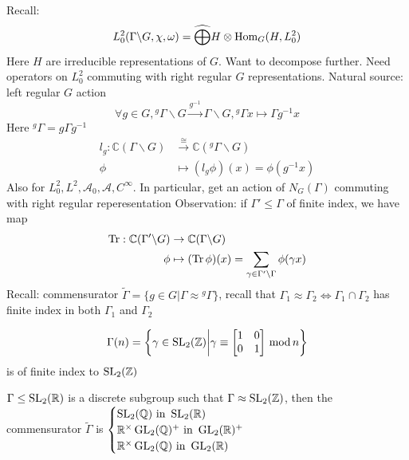 \documentclass[main]{subfiles}
\begin{document}
Recall:
\[L_0^2(\Gamma\backslash G,\chi,\omega)=\widehat{\bigoplus} H\otimes\operatorname{Hom}_G(H,L_0^2)\]
Here $H$ are irreducible representations of $G$.
Want to decompose further. Need operators on $L_0^2$ commuting with right regular $G$ representations. Natural source: left regular $G$ action
\[\forall g\in G,{^g\Gamma}\backslash G\xrightarrow{g^{-1}}\Gamma\backslash G,{^g\Gamma} x\mapsto\Gamma g^{-1}x\]
Here ${^g\Gamma}=g\Gamma g^{-1}$
\begin{align*}
l_g:\mathbb C(\Gamma\backslash G)&\xrightarrow{\cong}\mathbb C({^g\Gamma}\backslash G) \\
\phi&\mapsto (l_g\phi)(x)=\phi(g^{-1}x)
\end{align*}
Also for $L_0^2,L^2,\mathcal A_0,\mathcal A,C^\infty$. In particular, get an action of $N_G(\Gamma)$ commuting with right regular reperesentation
Observation: if $\Gamma'\leq \Gamma$ of finite index, we have map
\begin{align*}
\operatorname{Tr}:\mathbb C(\Gamma'\backslash G)&\to\mathbb C(\Gamma\backslash G) \\
\phi&\mapsto (\operatorname{Tr}\phi)(x)=\sum_{\gamma\in\Gamma'\setminus\Gamma}\phi(\gamma x)
\end{align*}
Recall: commensurator $\tilde \Gamma=\{g\in G|\Gamma\approx{^g\Gamma}\}$, recall that $\Gamma_1\approx\Gamma_2\iff\Gamma_1\cap\Gamma_2$ has finite index in both $\Gamma_1$ and $\Gamma_2$

\[
\Gamma(n)=\left\{\gamma\in\operatorname{SL}_2(\mathbb Z)\middle|\gamma\equiv\begin{bmatrix}
1&0\\
0&1
\end{bmatrix}\,\mathrm{mod}\, n\right\}\]
is of finite index to $\operatorname{SL}_2(\mathbb Z)$

\begin{example}
$\Gamma\leq\operatorname{SL}_2(\mathbb R)$ is a discrete subgroup such that $\Gamma\approx\operatorname{SL}_2(\mathbb Z)$, then the commensurator $\tilde \Gamma$ is $\begin{cases}
\operatorname{SL}_2(\mathbb Q)\text{ in }\operatorname{SL}_2(\mathbb R)\\
\mathbb R^\times\operatorname{GL}_2(\mathbb Q)^+\text{ in }\operatorname{GL}_2(\mathbb R)^+\\
\mathbb R^\times\operatorname{GL}_2(\mathbb Q)\text{ in }\operatorname{GL}_2(\mathbb R)
\end{cases}$
\end{example}
\end{document}
